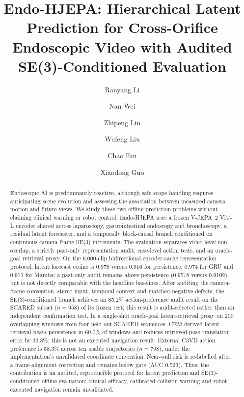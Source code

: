 \documentclass[preprint,12pt]{elsarticle}
\begin{document}
\begin{frontmatter}

\title{Endo-HJEPA: Hierarchical Latent Prediction for Cross-Orifice Endoscopic Video with Audited SE(3)-Conditioned Evaluation}

\author[haut]{Ranyang Li}
\author[hpp]{Nan Wei}
\author[buaa]{Zhipeng Lin}
\author[haut]{Wufeng Liu}
\author[haut]{Chao Fan}
\author[haut]{Xiaodong Guo}

\address[haut]{School of Artificial Intelligence and Big Data, Henan University of Technology, Zhengzhou 450001, China}
\address[hpp]{Henan Provincial People's Hospital, Zhengzhou 450003, China}
\address[buaa]{School of Computer Science and Engineering, Beihang University, Beijing 100191, China}

\begin{abstract}
Endoscopic AI is predominantly reactive, although safe scope handling requires
anticipating scene evolution and assessing the association between measured
camera motion and future views. We study these two offline prediction problems
without claiming clinical warning or robot control. Endo-HJEPA uses a frozen
V-JEPA~2 ViT-L encoder shared across laparoscopy, gastrointestinal endoscopy
and bronchoscopy, a residual latent forecaster, and a temporally block-causal
branch conditioned on continuous camera-frame SE(3) increments. The evaluation
separates video-level non-overlap, a strictly past-only representation audit,
case-level action tests, and an oracle-goal retrieval proxy. On the 6,000-clip
bidirectional-encoder-cache representation protocol, latent forecast cosine is 0.978 versus 0.916
for persistence, 0.974 for GRU and 0.971 for Mamba; a past-only audit remains
above persistence (0.9578 versus 0.9102) but is not directly comparable with
the headline baselines. After auditing the camera-frame convention, stereo
input, temporal context and matched-negative defects, the SE(3)-conditioned branch
achieves an 85.2\% action-preference audit result on the SCARED subset
($n{=}958$) of its frozen test; this result is audit-selected rather than an
independent confirmation test. In a single-shot oracle-goal
latent-retrieval proxy on 200 overlapping windows from four held-out SCARED
sequences, CEM-derived latent retrieval beats persistence in 60.0\% of
windows and reduces retrieved-pose translation error by 33.8\%; this is not
an executed navigation result. External C3VD action preference is 58.3\%
across ten usable trajectories ($n=798$), under the implementation's
unvalidated coordinate convention. Near-wall risk is re-labelled after a
frame-alignment correction and remains below gate (AUC 0.523). Thus, the
contribution is an audited, reproducible protocol for latent prediction and
SE(3)-conditioned offline evaluation; clinical efficacy, calibrated collision
warning and robot-executed navigation remain unvalidated.
\end{abstract}


\end{frontmatter}
\end{document}
